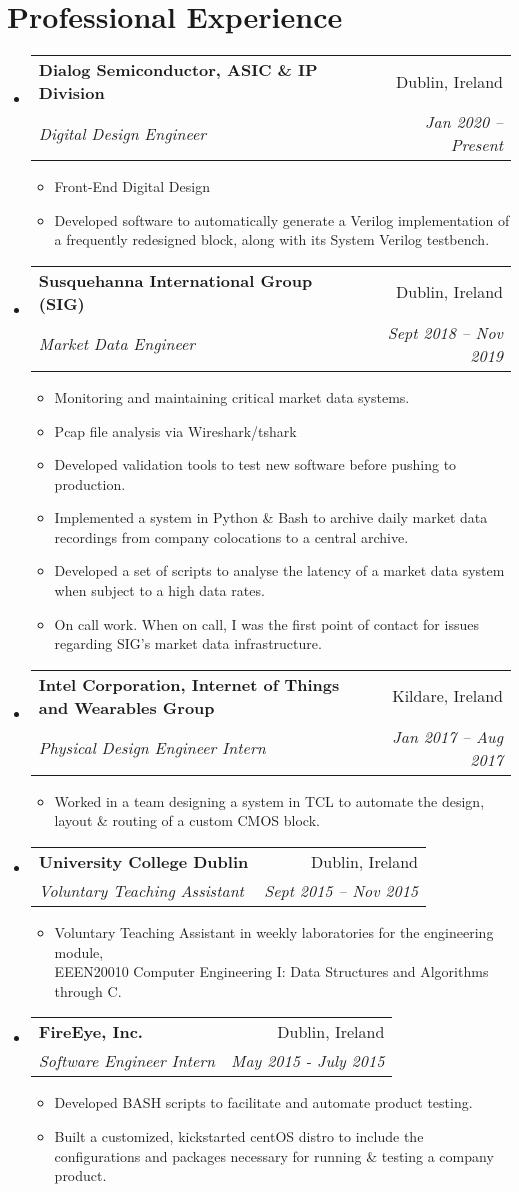 \documentclass[letterpaper,11pt]{article}
\makeatletter
\newcommand{\resumeGenItem}[1]{
  \item\small{
    {#1 \vspace{-2pt}}
  }
}
\newcommand{\resumeSubheading}[4]{
  \vspace{-1pt}\item
    \begin{tabular*}{0.97\textwidth}{l@{\extracolsep{\fill}}r}
      \textbf{#1} & #2 \\
      \textit{\small#3} & \textit{\small #4} \\
    \end{tabular*}\vspace{-5pt}
}
\newcommand{\resumeSubHeadingListStart}{\begin{itemize}[leftmargin=*]}
\newcommand{\resumeSubHeadingListEnd}{\end{itemize}}
\newcommand{\resumeItemListStart}{\begin{itemize}}
\newcommand{\resumeItemListEnd}{\end{itemize}\vspace{-5pt}}
\makeatother
\begin{document}
\section{Professional Experience}
\medskip
 \resumeSubHeadingListStart
    \resumeSubheading
      {Dialog Semiconductor, ASIC \& IP Division} {Dublin, Ireland}
      {Digital Design Engineer}{Jan 2020 -- Present}
      \resumeItemListStart
         \resumeGenItem{Front-End Digital Design} 
         \resumeGenItem{Developed software to automatically generate a Verilog implementation of a frequently redesigned block, along with its System Verilog testbench.}
      \resumeItemListEnd
      \bigskip
    \resumeSubheading
      {Susquehanna International Group (SIG)} {Dublin, Ireland}
      {Market Data Engineer}{Sept 2018 -- Nov 2019}
      \resumeItemListStart
      \resumeGenItem{Monitoring and maintaining critical market data systems.}
      \resumeGenItem{Pcap file analysis via Wireshark/tshark}
      \resumeGenItem{Developed validation tools to test new software before pushing to production.}
    \resumeGenItem{Implemented a system in Python \& Bash to archive daily market data recordings from company colocations to a central archive.}
     \resumeGenItem{
         Developed a set of scripts to analyse the latency of a  market data system when subject to a high data rates.}
    \resumeGenItem{On call work. When on call, I was the first point of contact for issues regarding SIG's market data infrastructure.}
      \resumeItemListEnd
      \bigskip
     \resumeSubheading
      {Intel Corporation, Internet of Things and Wearables Group} {Kildare, Ireland}
      {Physical Design Engineer Intern}{Jan 2017 -- Aug 2017}
      \resumeItemListStart
         \resumeGenItem{Worked in a team designing a system in TCL to automate the design, layout \& routing of a custom CMOS block.}
      \resumeItemListEnd
      \bigskip
      \resumeSubheading
      {University College Dublin} {Dublin, Ireland}
      {Voluntary Teaching Assistant}{Sept 2015 -- Nov 2015}
      \resumeItemListStart
        \resumeGenItem{Voluntary Teaching Assistant in weekly laboratories for the engineering module,\\ 

EEEN20010	Computer Engineering I: Data Structures and Algorithms through C.}
      \resumeItemListEnd
\bigskip
      \resumeSubheading
      {FireEye, Inc.} {Dublin, Ireland}
      {Software Engineer Intern}{May 2015 - July 2015}
      \resumeItemListStart
        \resumeGenItem{Developed BASH scripts to facilitate and automate product testing.}
         \resumeGenItem{Built a customized, kickstarted centOS distro to include the configurations and packages necessary for running \& testing a company product.}
      \resumeItemListEnd
  \resumeSubHeadingListEnd
\end{document}
